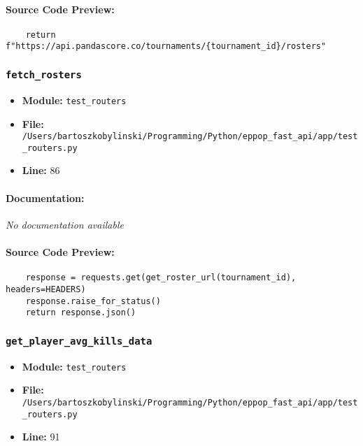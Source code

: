 \documentclass[11pt,a4paper]{article}
\begin{document}
\paragraph{Source Code Preview:}
\begin{verbatim}
    return f"https://api.pandascore.co/tournaments/{tournament_id}/rosters"
\end{verbatim}

\vspace{1em}
\subsubsection{\texttt{fetch\_rosters}}

\begin{itemize}
    \item \textbf{Module:} \texttt{test\_routers}
    \item \textbf{File:} \texttt{/Users/bartoszkobylinski/Programming/Python/eppop\_fast\_api/app/test\_routers.py}
    \item \textbf{Line:} 86
\end{itemize}

\paragraph{Documentation:} \textit{No documentation available}

\paragraph{Source Code Preview:}
\begin{verbatim}
    response = requests.get(get_roster_url(tournament_id), headers=HEADERS)
    response.raise_for_status()
    return response.json()
\end{verbatim}

\vspace{1em}
\subsubsection{\texttt{get\_player\_avg\_kills\_data}}

\begin{itemize}
    \item \textbf{Module:} \texttt{test\_routers}
    \item \textbf{File:} \texttt{/Users/bartoszkobylinski/Programming/Python/eppop\_fast\_api/app/test\_routers.py}
    \item \textbf{Line:} 91
\end{itemize}
\end{document}
